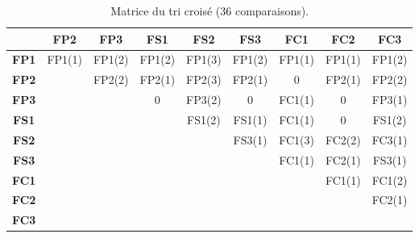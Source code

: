\begin{table}[H]
\centering
{\small
\setlength{\tabcolsep}{3pt}
\renewcommand{\arraystretch}{1.3}
\begin{tabular}{|c|c|c|c|c|c|c|c|c|}
\hline
\cellcolor{gray!15} & \cellcolor{whybg}\textbf{FP2} & \cellcolor{whybg}\textbf{FP3} & \cellcolor{whatbg}\textbf{FS1} & \cellcolor{whatbg}\textbf{FS2} & \cellcolor{whatbg}\textbf{FS3} & \cellcolor{defibg}\textbf{FC1} & \cellcolor{defibg}\textbf{FC2} & \cellcolor{defibg}\textbf{FC3} \\ \hline
\cellcolor{whybg}\textbf{FP1} & \cellcolor{whybg}FP1(1) & \cellcolor{whybg}FP1(2) & \cellcolor{whybg}FP1(2) & \cellcolor{whybg}FP1(3) & \cellcolor{whybg}FP1(2) & \cellcolor{whybg}FP1(1) & \cellcolor{whybg}FP1(1) & \cellcolor{whybg}FP1(2) \\ \hline
\cellcolor{whybg}\textbf{FP2} & \cellcolor{gray!35} & \cellcolor{whybg}FP2(2) & \cellcolor{whybg}FP2(1) & \cellcolor{whybg}FP2(3) & \cellcolor{whybg}FP2(1) & \cellcolor{gray!10}0 & \cellcolor{whybg}FP2(1) & \cellcolor{whybg}FP2(2) \\ \hline
\cellcolor{whybg}\textbf{FP3} & \cellcolor{gray!35} & \cellcolor{gray!35} & \cellcolor{gray!10}0 & \cellcolor{whybg}FP3(2) & \cellcolor{gray!10}0 & \cellcolor{defibg}FC1(1) & \cellcolor{gray!10}0 & \cellcolor{whybg}FP3(1) \\ \hline
\cellcolor{whatbg}\textbf{FS1} & \cellcolor{gray!35} & \cellcolor{gray!35} & \cellcolor{gray!35} & \cellcolor{whatbg}FS1(2) & \cellcolor{whatbg}FS1(1) & \cellcolor{defibg}FC1(1) & \cellcolor{gray!10}0 & \cellcolor{whatbg}FS1(2) \\ \hline
\cellcolor{whatbg}\textbf{FS2} & \cellcolor{gray!35} & \cellcolor{gray!35} & \cellcolor{gray!35} & \cellcolor{gray!35} & \cellcolor{whatbg}FS3(1) & \cellcolor{defibg}FC1(3) & \cellcolor{defibg}FC2(2) & \cellcolor{defibg}FC3(1) \\ \hline
\cellcolor{whatbg}\textbf{FS3} & \cellcolor{gray!35} & \cellcolor{gray!35} & \cellcolor{gray!35} & \cellcolor{gray!35} & \cellcolor{gray!35} & \cellcolor{defibg}FC1(1) & \cellcolor{defibg}FC2(1) & \cellcolor{whatbg}FS3(1) \\ \hline
\cellcolor{defibg}\textbf{FC1} & \cellcolor{gray!35} & \cellcolor{gray!35} & \cellcolor{gray!35} & \cellcolor{gray!35} & \cellcolor{gray!35} & \cellcolor{gray!35} & \cellcolor{defibg}FC1(1) & \cellcolor{defibg}FC1(2) \\ \hline
\cellcolor{defibg}\textbf{FC2} & \cellcolor{gray!35} & \cellcolor{gray!35} & \cellcolor{gray!35} & \cellcolor{gray!35} & \cellcolor{gray!35} & \cellcolor{gray!35} & \cellcolor{gray!35} & \cellcolor{defibg}FC2(1) \\ \hline
\cellcolor{defibg}\textbf{FC3} & \cellcolor{gray!35} & \cellcolor{gray!35} & \cellcolor{gray!35} & \cellcolor{gray!35} & \cellcolor{gray!35} & \cellcolor{gray!35} & \cellcolor{gray!35} & \cellcolor{gray!35} \\ \hline
\end{tabular}}
\caption{Matrice du tri croisé (36 comparaisons).}
\label{tab:tri}
\end{table}

